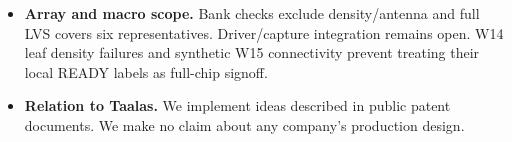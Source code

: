 \begin{itemize}
\item \textbf{Array and macro scope.} Bank checks exclude density/antenna and full LVS covers six representatives. Driver/capture integration remains open. W14 leaf density failures and synthetic W15 connectivity prevent treating their local READY labels as full-chip signoff.
\item \textbf{Relation to Taalas.} We implement ideas described in public patent documents. We make no claim about any company's production design.
\end{itemize}

